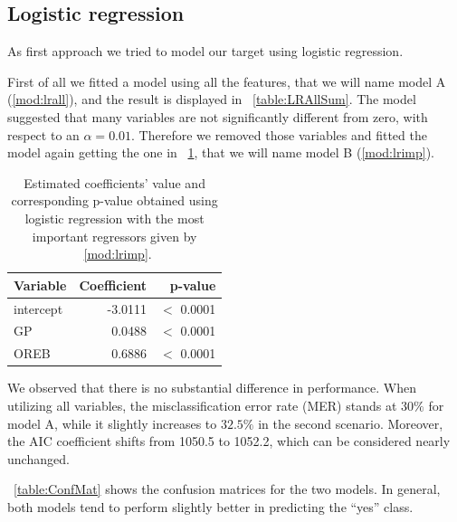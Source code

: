 \subsection{Logistic regression}\label{appendix:lr}

As first approach we tried to model our target using logistic regression.

First of all we fitted a model using all the features, that we will name model A (\ref{mod:lrall}), and the result is displayed in \Tab~\ref{table:LRAllSum}. The model suggested that many variables are not significantly different from zero, with respect to an $\alpha = 0.01$. Therefore we removed those variables and fitted the model again getting the one in \Tab~\ref{table:LRImpSum}, that we will name model B (\ref{mod:lrimp}).

\begin{center}
\end{center}

\begin{table}[h]
	\centering
	\begin{tabular}{|| l | r | r ||} 
		\hline
		Variable & Coefficient & p-value \\
		\hline
		\hline
		intercept & -3.0111 & $<$ 0.0001 \\
		GP & 0.0488 & $<$ 0.0001 \\
		OREB & 0.6886 & $<$ 0.0001 \\	
		\hline
	\end{tabular}
	\caption{Estimated coefficients' value and corresponding p-value obtained using logistic regression with the most important regressors given by \Mod~\ref{mod:lrimp}.}
	\label{table:LRImpSum}
\end{table}

We observed that there is no substantial difference in performance. When utilizing all variables, the misclassification error rate (MER) stands at $30\%$ for model A, while it slightly increases to $32.5\%$ in the second scenario. Moreover, the AIC coefficient shifts from 1050.5 to 1052.2, which can be considered nearly unchanged.

\Tab~\ref{table:ConfMat} shows the confusion matrices for the two models. In general, both models tend to perform slightly better in predicting the ``yes'' class.

